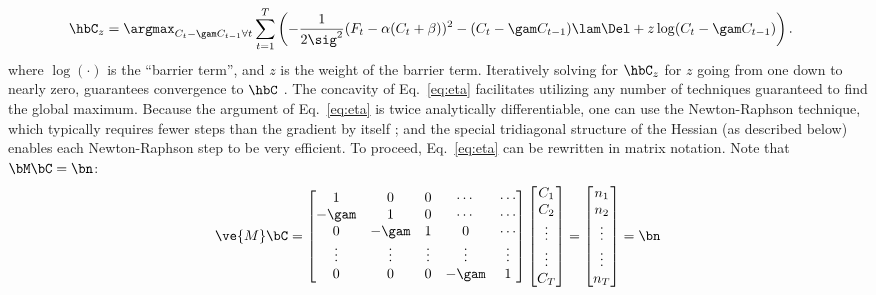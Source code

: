 \begin{align} \label{eq:eta}
\hbC_{\zzz} &= \argmax_{C_t-\gam C_{t-1} \forall t}  \sum_{t=1}^T \left( -\frac{1}{2 \sig^2}(F_t - \alpha(C_t + \beta))^2  -  (C_t-\gam C_{t-1})  \lam \Del + \zzz \log (C_t-\gam C_{t-1}) \right).
\end{align}
\noindent where $\log (\cdot)$ is the ``barrier term'', and $z$ is the weight of the barrier term.  Iteratively solving for $\hbC_{\zzz}$ for $z$ going from one down to nearly zero, guarantees convergence to $\hbC$ \cite{CONV04}. %
The concavity of Eq.~\eqref{eq:eta} facilitates utilizing any number of techniques guaranteed to find the global maximum.  Because the argument of Eq.~\eqref{eq:eta} is twice analytically differentiable, one can use the Newton-Raphson technique, which typically requires fewer steps than the gradient by itself \cite{CONV04}; and the special tridiagonal structure of the Hessian (as described below) enables each Newton-Raphson step to be very efficient.  To proceed, Eq.~\eqref{eq:eta} can be rewritten in matrix notation.  Note that $\bM \bC = \bn$:
\begin{align} \label{eq:M}
\ve{M} \bC = %
\begin{bmatrix}
1 & 0  & 0 & \cdots & \cdots \\
-\gam & 1 & 0 & \cdots & \cdots \\
0 & -\gam & 1 & 0 & \cdots  \\
\vdots & \vdots & \vdots & \vdots & \vdots  \\
0 & 0 & 0 & -\gam & 1
\end{bmatrix}
\begin{bmatrix}
C_1 \\ C_2 \\ \vdots \\ \vdots \\ C_T  
\end{bmatrix}
= 
\begin{bmatrix}
n_1 \\ n_2 \\ \vdots \\ \vdots \\ n_T
\end{bmatrix}
= \bn
\end{align}
